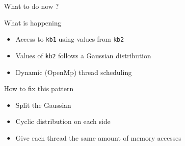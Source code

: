 \documentclass[xcolor={usenames,dvipsnames}]{beamer}
\begin{document}
\begin{frame}{What to do now ?}
    \begin{block}{What is happening}
        \begin{itemize}
            \item Access to \texttt{kb1} using values from \texttt{kb2}
            \item Values of \texttt{kb2} follows a Gaussian distribution
            \item Dynamic (OpenMp) thread scheduling
        \end{itemize}
    \end{block}
    \pause
    \begin{alertblock}{How to fix this pattern}
        \begin{itemize}
            \item Split the Gaussian
            \item Cyclic distribution on each side
            \item Give each thread the same amount of memory accesses
        \end{itemize}
    \end{alertblock}
\end{frame}
\end{document}
